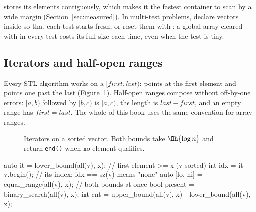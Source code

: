  stores its elements contiguously, which makes it the fastest container to scan by a wide margin
(Section~\ref{sec:measured}). In multi-test problems, declare vectors inside  so that each test starts fresh,
or reset them with : a global array cleared with  in every test costs its full size each time, even
when the test is tiny.

\subsection{Iterators and half-open ranges}

Every STL algorithm works on a  $[\mathit{first}, \mathit{last})$:  points at the first
element and  points one past the last (Figure~\ref{fig:iterators}). Half-open ranges compose without off-by-one
errors: $[a, b)$ followed by $[b, c)$ is $[a, c)$, the length is $\mathit{last} - \mathit{first}$, and an empty range has
$\mathit{first} = \mathit{last}$. The whole of this book uses the same convention for array ranges.

\begin{figure}[htbp]
\centering
{}
\caption{Iterators on a sorted vector. Both bounds take $\Oh{\log n}$ and return \texttt{end()} when no element qualifies.}
\label{fig:iterators}
\end{figure}

\begin{code}
auto it = lower_bound(all(v), x);      // first element >= x (v sorted)
int idx = it - v.begin();              // its index; idx == sz(v) means "none"
auto [lo, hi] = equal_range(all(v), x); // both bounds at once
bool present = binary_search(all(v), x);
int cnt = upper_bound(all(v), x) - lower_bound(all(v), x);
\end{code}

